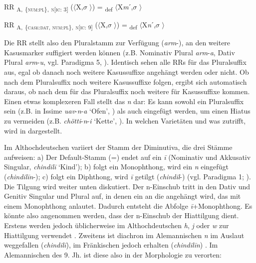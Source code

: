 \ea%
\label{ex:key:54}
 RR \textsubscript{A,} \textsubscript{\{\textsc{num:pl}\},} \textsubscript{\textsc{n[}\textsc{ic:} 3]} ($\langle$X,$\sigma$ $\rangle$) = \textsubscript{def} $\langle$X\textit{m}ˊ,$\sigma$ $\rangle$
\z

\ea%
\label{ex:key:55}
 RR \textsubscript{A,} \textsubscript{\{\textsc{case:dat}, \textsc{num:pl}\},} \textsubscript{\textsc{n[}\textsc{ic:} 9]} ($\langle$X,$\sigma$ $\rangle$) = \textsubscript{def} $\langle$X\textit{n}ˊ,$\sigma$ $\rangle$
\z

Die RR  stellt also den Pluralstamm zur Verfügung (\textit{arm}-), an den weitere Kasusmarker suffigiert werden können (z.B. Nominativ Plural \textit{arm}-\textit{a}, Dativ Plural \textit{arm}-\textit{u}, vgl. Paradigma 5, \citealt[120]{Wipf1911}). Identisch sehen alle RRs für das Pluralsuffix aus, egal ob danach noch weitere Kasussuffixe angehängt werden oder nicht. Ob nach dem Pluralsuffix noch weitere Kasussuffixe folgen, ergibt sich automatisch daraus, ob nach dem  für das Pluralsuffix noch weitere  für Kasussuffixe kommen. Einen etwas komplexeren Fall stellt das \textit{n} dar: Es kann sowohl ein Pluralsuffix sein (z.B. in Issime \textit{uav}-\textit{n}-\textit{a} ‘Ofen’, \citealt[164]{Zürrer1999}) als auch eingefügt werden, um einen Hiatus zu vermeiden (z.B. \textit{chötti}-\textit{n}-\textit{i} ‘Kette’, \citealt[164]{Zürrer1999}). In welchen Varietäten und  was zutrifft, wird in  dargestellt.

Im Althochdeutschen variiert der Stamm der Diminutiva, die drei Stämme aufweisen: a) Der Default-Stamm (=) endet auf ein \textit{\=i} (Nominativ und Akkusativ Singular, \textit{chindil\=i} ‘Kind’); b) folgt ein Monophthong, wird ein \textit{n} eingefügt (\textit{chindil\=in}-); c) folgt ein Diphthong, wird \textit{\=i} getilgt (\textit{chindil}-) (vgl. Paradigma 1; \citealt[187]{Braune2004}). Die Tilgung wird weiter unten diskutiert. Der n-Einschub tritt in den  Dativ und Genitiv Singular und Plural auf, in denen ein  an die  angehängt wird, das mit einem Monophthong anlautet. Dadurch entsteht die Abfolge \textit{\=i}+Monophthong. Es könnte also angenommen werden, dass der n-Einschub der Hiattilgung dient. Erstens werden jedoch üblicherweise im Althochdeutschen \textit{h}, \textit{j} oder \textit{w} zur Hiattilgung verwendet \citep[49]{Armborst1979}. Zweitens ist diachron im Alemannischen \textit{n} im Auslaut weggefallen (\textit{chindil\=i}), im Fränkischen jedoch erhalten (\textit{chindil\=in}) \citep[187]{Braune2004}. Im Alemannischen des 9. Jh. ist diese  also in der Morphologie zu verorten:


